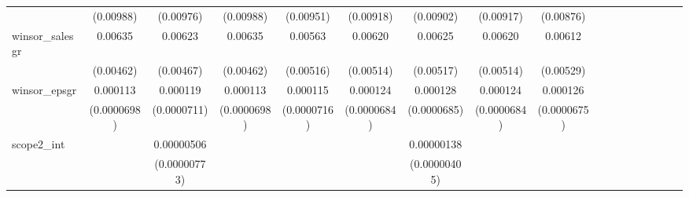 \begin{table}[htbp]
\begin{tabular}{l*{16}{c}}
                    &   (0.00988)         &   (0.00976)         &   (0.00988)         &   (0.00951)         &   (0.00918)         &   (0.00902)         &   (0.00917)         &   (0.00876)         &                     &                     &                     &                     &                     &                     &                     &                     \\
[1em]
winsor\_salesgr      &     0.00635         &     0.00623         &     0.00635         &     0.00563         &     0.00620         &     0.00625         &     0.00620         &     0.00612         &                     &                     &                     &                     &                     &                     &                     &                     \\
                    &   (0.00462)         &   (0.00467)         &   (0.00462)         &   (0.00516)         &   (0.00514)         &   (0.00517)         &   (0.00514)         &   (0.00529)         &                     &                     &                     &                     &                     &                     &                     &                     \\
[1em]
winsor\_epsgr        &    0.000113         &    0.000119\sym{*}  &    0.000113         &    0.000115         &    0.000124\sym{*}  &    0.000128\sym{*}  &    0.000124\sym{*}  &    0.000126\sym{*}  &                     &                     &                     &                     &                     &                     &                     &                     \\
                    & (0.0000698)         & (0.0000711)         & (0.0000698)         & (0.0000716)         & (0.0000684)         & (0.0000685)         & (0.0000684)         & (0.0000675)         &                     &                     &                     &                     &                     &                     &                     &                     \\
[1em]
scope2\_int          &                     &  0.00000506         &                     &                     &                     &  0.00000138         &                     &                     &                     &                     &                     &                     &                     &                     &                     &                     \\
                    &                     &(0.00000773)         &                     &                     &                     &(0.00000405)         &                     &                     &                     &                     &                     &                     &                     &                     &                     &                     \\

\end{tabular}
\end{table}
